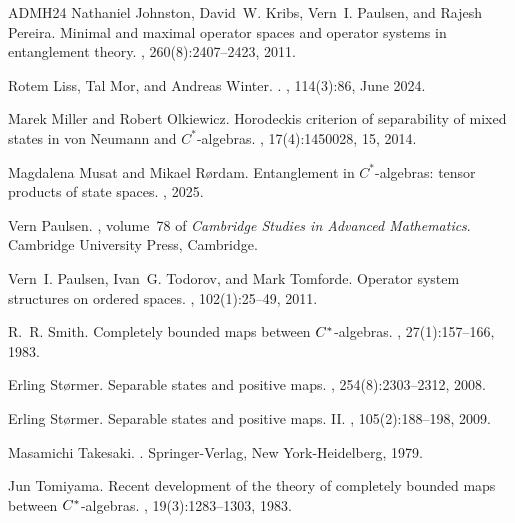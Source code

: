 \documentclass[11pt]{article}
\numberwithin{theorem}{section}
\begin{document}
\begin{thebibliography}{ADMH{\etalchar{+}}24}
Nathaniel Johnston, David~W. Kribs, Vern~I. Paulsen, and Rajesh Pereira.
\newblock Minimal and maximal operator spaces and operator systems in
  entanglement theory.
, 260(8):2407--2423, 2011.

Rotem {Liss}, Tal {Mor}, and Andreas {Winter}.
.
, 114(3):86, June 2024.

Marek Miller and Robert Olkiewicz.
\newblock Horodeckis criterion of separability of mixed states in von {N}eumann
  and {$C^*$}-algebras.
,
  17(4):1450028, 15, 2014.

Magdalena Musat and Mikael R{\o}rdam.
\newblock Entanglement in ${C}^{\ast}$-algebras: tensor products of state
  spaces.
, 2025.

Vern Paulsen.
, volume~78 of
  {\em Cambridge Studies in Advanced Mathematics}.
\newblock Cambridge University Press, Cambridge.

Vern~I. Paulsen, Ivan~G. Todorov, and Mark Tomforde.
\newblock Operator system structures on ordered spaces.
, 102(1):25--49,
  2011.

R.~R. Smith.
\newblock Completely bounded maps between {$C\sp{\ast} $}-algebras.
, 27(1):157--166, 1983.

Erling St{\o}rmer.
\newblock Separable states and positive maps.
, 254(8):2303--2312, 2008.

Erling St{\o}rmer.
\newblock Separable states and positive maps. {II}.
, 105(2):188--198, 2009.

Masamichi Takesaki.
.
\newblock Springer-Verlag, New York-Heidelberg, 1979.

Jun Tomiyama.
\newblock Recent development of the theory of completely bounded maps between
  {$C\sp{\ast} $}-algebras.
, 19(3):1283--1303, 1983.

\end{thebibliography}


%
%
\end{document}
